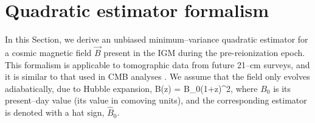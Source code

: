 \section{Quadratic estimator formalism}
\label{sec:estimators}

In this Section, we derive an unbiased minimum--variance quadratic estimator for a cosmic magnetic field $\vec B$ present in the IGM during the pre-reionization epoch. This formalism is applicable to tomographic data from future 21--cm surveys, and it is similar to that used in CMB analyses \cite{2003PhRvD..67h3002O}. We assume that the field only evolves adiabatically, due to Hubble expansion, 
\beq
B(z) = B_0(1+z)^2,
\label{eq:B0}
\eeq
where $B_0$ is its present--day value (its value in comoving units), and the corresponding estimator is denoted with a hat sign, $\widehat B_0$. 


